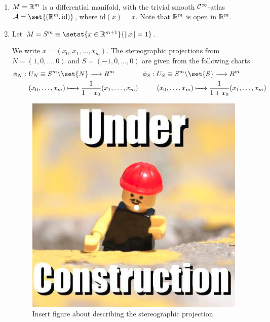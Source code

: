 \begin{example}
	~
	\begin{enumerate}[(1)]
		\item
		$M=\mathbb R^m$ is a differential manifold, with the trivial smooth $\mathcal{C}^\infty$-atlas $\calA = \set{(\bbR^m, \mathrm{id})}$, where $\mathrm{id}(x)=x$. Note that $\mathbb R^m$ is open in $\mathbb R^m$.

		\item
		Let $M=S^{m}\equiv \setst{x\in\bbR^{m+1}}{\norm{x}=1}$. 
			
		We write $x=(x_0,x_1,\dots,x_m)$. The stereographic projections from $N=(1,0,\dots,0)$ and $S=(-1,0,\dots,0)$ are given from the following charts
		\begin{align*}
			\begin{split}
				\phi_N :~ &U_N \equiv S^m\backslash\set{N} \to R^m \\
				&(x_0, \dots, x_m) \mapsto \frac{1}{1-x_0}(x_1, \dots, x_m) 
			\end{split}
			~~
			\begin{split}
				\phi_S :~ &U_S \equiv S^m\backslash\set{S} \to R^m \\
				&(x_0, \dots, x_m) \mapsto \frac{1}{1+x_0}(x_1, \dots, x_m) 
			\end{split}
		\end{align*}

		\begin{figure}[H]
			\centering
			\includegraphics[scale=0.3]{Figures/underconstruction.jpg}
			\caption{\color{red} Insert figure about describing the stereographic projection}
		\end{figure}
		

\end{enumerate}
\end{example}
